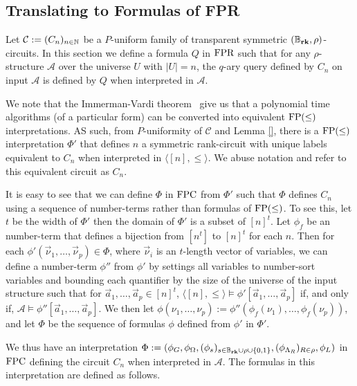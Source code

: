 \documentclass[../paper.tex]{subfiles}
\begin{document}
\subsection{Translating to Formulas of FPR}
\label{sec:translating-formulas-to-FPR}
Let $\mathcal{C}:= (C_n)_{n \in \mathbb{N}}$ be a $P$-uniform family of transparent
symmetric $(\mathbb{B}_{\text{\textbf{rk}}}, \rho)$-circuits. In this section we define a formula $Q$ in
$\text{\upshape FPR}$ such that for any $\rho$-structure $\mathcal{A}$ over the universe $U$
with $\vert U \vert = n$, the $q$-ary query defined by $C_n$ on input
$\mathcal{A}$ is defined by $Q$ when interpreted in $\mathcal{A}$.

We note that the Immerman-Vardi theorem~\cite{} give us that a polynomial time
algorithms (of a particular form) can be converted into equivalent $\text{\upshape FP}(\leq)$
interpretations. AS such, from $P$-uniformity of $\mathcal{C}$ and Lemma \ref{},
there is a $\text{\upshape FP}(\leq)$ interpretation $\Phi'$ that defines $n$ a symmetric
rank-circuit with unique labels equivalent to $C_n$ when interpreted in $\langle
[n], \leq \rangle$. We abuse notation and refer to this equivalent circuit as
$C_n$.

It is easy to see that we can define $\Phi$ in $\text{\upshape FPC}$ from $\Phi'$ such that
$\Phi$ defines $C_n$ using a sequence of number-terms rather than formulas of
$\text{\upshape FP}(\leq)$. To see this, let $t$ be the width of $\Phi'$ then the domain of
$\Phi'$ is a subset of $[n]^t$. Let $\phi_f$ be an number-term that defines a
bijection from $[n^t]$ to $[n]^t$ for each $n$. Then for each $\phi'
(\vec{\nu}_1, \ldots, \vec{\nu}_{p}) \in \Phi$, where $\vec{\nu}_i$ is an
$t$-length vector of variables, we can define a number-term $\phi''$ from
$\phi'$ by settings all variables to number-sort variables and bounding each
quantifier by the size of the universe of the input structure such that for
$\vec{a}_1, \ldots, \vec{a}_p \in [n]^t$, $\langle [n], \leq \rangle \models
\phi' [\vec{a}_1, \ldots, \vec{a}_p]$ if, and only if, $\mathcal{A} \models
\phi'' [\vec{a}_1, \ldots, \vec{a}_p]$. We then let $\phi(\nu_1, \ldots, \nu_p)
:= \phi''(\phi_f (\nu_1), \ldots, \phi_f(\nu_p))$, and let $\Phi$ be the
sequence of formulas $\phi$ defined from $\phi'$ in $\Phi'$.

We thus have an interpretation $\Phi := (\phi_G, \phi_\Omega, (\phi_s)_{ s \in
  \mathbb{B}_{\text{\textbf{rk}}} \cup \rho \cup \{0,1\}}, (\phi_{\Lambda_R})_{R \in \rho}, \phi_L)$ in
$\text{\upshape FPC}$ defining the circuit $C_n$ when interpreted in $\mathcal{A}$. The
formulas in this interpretation are defined as follows.
\end{document}
